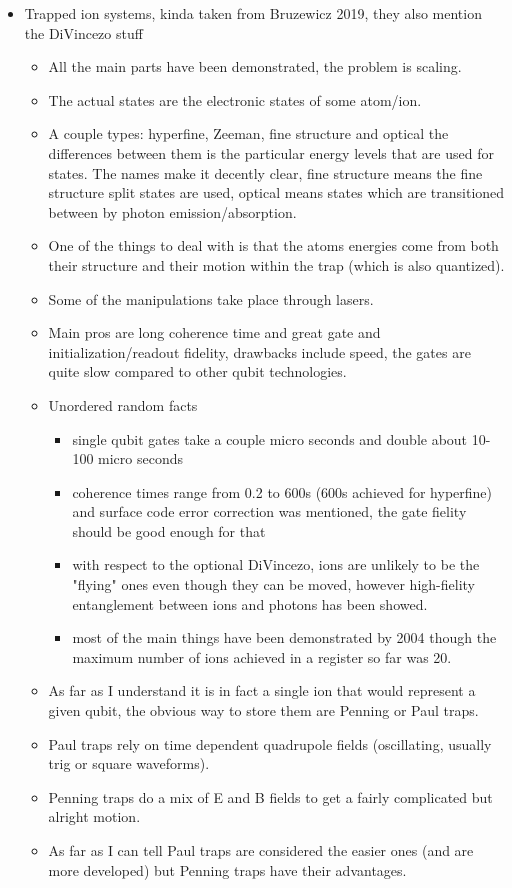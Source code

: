 \begin{itemize}
\item Trapped ion systems, kinda taken from Bruzewicz 2019, they also mention the DiVincezo stuff
\begin{itemize}
    \item All the main parts have been demonstrated, the problem is scaling.
    \item The actual states are the electronic states of some atom/ion.
    \item A couple types: hyperfine, Zeeman, fine structure and optical the differences between them is the particular energy levels that are used for states.
            The names make it decently clear, fine structure means the fine structure split states are used, optical means states which are transitioned between by photon emission/absorption.
    \item One of the things to deal with is that the atoms energies come from both their structure and their motion within the trap (which is also quantized).
    \item Some of the manipulations take place through lasers.
    \item Main pros are long coherence time and great gate and initialization/readout fidelity, drawbacks include speed, the gates are quite slow compared to other qubit technologies.
    \item Unordered random facts
    \begin{itemize}
        \item single qubit gates take a couple micro seconds and double about 10-100 micro seconds
        \item coherence times range from 0.2 to 600s (600s achieved for hyperfine) and surface code error correction was mentioned, the gate fielity should be good enough for that
        \item with respect to the optional DiVincezo, ions are unlikely to be the "flying" ones even though they can be moved, however high-fielity entanglement between ions and photons has been showed.
        \item most of the main things have been demonstrated by 2004 though the maximum number of ions achieved in a register so far was 20.
    \end{itemize}

    \item As far as I understand it is in fact a single ion that would represent a given qubit, the obvious way to store them are Penning or Paul traps.
    \item Paul traps rely on time dependent quadrupole fields (oscillating, usually trig or square waveforms).
    \item Penning traps do a mix of E and B fields to get a fairly complicated but alright motion.
    \item As far as I can tell Paul traps are considered the easier ones (and are more developed) but Penning traps have their advantages.


\end{itemize}
\end{itemize}
